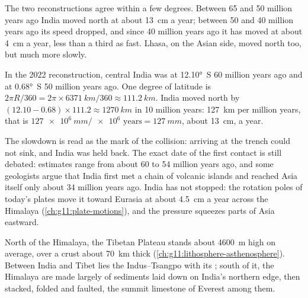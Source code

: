 The two reconstructions agree within a few degrees. Between 65 and 50 million
years ago India moved north at about \qty{13}{cm} a year; between 50 and 40
million years ago its speed dropped, and
since 40 million years ago it has moved at about \qty{4}{cm} a year, less
than a third as fast. Lhasa, on the Asian side, moved north too, but much
more slowly.

\begin{example}\label{ex:g12:mountain-building:india}
In the 2022 reconstruction, central India was at \ang{12.10}~S 60 million
years ago and at \ang{0.68}~S 50 million years ago. One degree of latitude is
$2\pi R/360 = 2\pi \times \qty{6371}{km}/360 \approx \qty{111.2}{km}$. India
moved north by $(12.10 - 0.68) \times 111.2 \approx \qty{1270}{km}$ in 10
million years: \qty{127}{km} per million years, that is $\qty{127e6}{mm} /
\num{e6}\text{ years} = \qty{127}{mm}$, about \qty{13}{cm}, a year.
\end{example}

The slowdown is read as the mark of the collision: 
arriving at the trench could not sink, and India was held back. The exact date of the first contact is still debated: estimates
range from about 60 to 54 million years ago, and some geologists argue that
India first met a chain of volcanic islands and reached Asia itself only
about 34 million years ago. India has not stopped: the rotation poles of
today's plates move it toward Eurasia at about \qty{4.5}{cm} a year across
the Himalaya (\cref{ch:g11:plate-motions}), and the pressure squeezes parts of
Asia eastward.

North of the Himalaya, the Tibetan Plateau stands about \qty{4600}{m} high on
average, over a crust about \qty{70}{km} thick
(\cref{ch:g11:lithosphere-asthenosphere}). Between India and Tibet lies the
Indus--Tsangpo  with its ; south of it, the Himalaya are
made largely of sediments laid down on India's northern edge, then stacked,
folded and faulted, the summit limestone of Everest among them.

